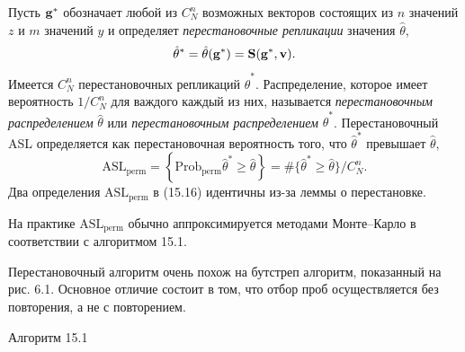Пусть $\bf{g}^*$ обозначает любой из $C_N^n$ возможных векторов состоящих из $n$ значений $z$ и $m$ значений $y$ и определяет \textit{перестановочные репликации} значения $\hat{\theta}$,
\begin{equation}
	\hat{\theta}^* = \hat{\theta}(\bf{g^*}) = S(\bf{g}^*, \bf{v}).
\end{equation}
Имеется $C_N^n$ перестановочных репликаций $\hat{\theta}^*$. Распределение, которое имеет вероятность $1/C_N^n$ для важдого каждый из них, называется \textit{перестановочным распределением} $\hat{\theta}$ или \textit{перестановочным распределением} $\hat{\theta}^*$. Перестановочный ASL определяется как перестановочная вероятность того, что $\hat{\theta}^*$ превышает $\hat{\theta}$,
\begin{equation}
	\text{ASL}_{\text{perm}} = \left\{ \text{Prob}_{\text{perm}} {\hat{\theta}^* \geq \hat{\theta}} \right\} = \# \{ \hat{\theta}^* \geq \hat{\theta} \} / C_N^n.
\end{equation}
Два определения $\text{ASL}_{\text{perm}}$ в (15.16) идентичны из-за леммы о перестановке.

На практике $\text{ASL}_\text{perm}$ обычно аппроксимируется методами Монте--Карло в соответствии с алгоритмом 15.1.

Перестановочный алгоритм очень похож на бутстреп алгоритм, показанный на рис. 6.1. Основное отличие состоит в том, что отбор проб осуществляется без повторения, а не с повторением.
\begin{center}
	Алгоритм 15.1
\end{center}
\noindent{}\\


